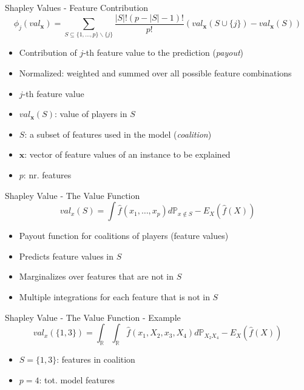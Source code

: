 \begin{frame}{Shapley Values - Feature Contribution}
\begin{equation}
	\phi_j(val_{\bm{x}})=\sum_{S\subseteq\{1,\ldots,p\} \backslash \{j\}}\frac{|S|!\left(p-|S|-1\right)!}{p!}\left(val_{\bm{x}}\left(S\cup\{j\}\right)-val_{\bm{x}}(S)\right)
\end{equation}
\begin{itemize}
	\item Contribution of $j$-th feature value to the prediction (\emph{payout})
	\item Normalized: weighted and summed over all possible feature combinations
	\item $j$-th feature value
	\item $val_{\bm{x}}(S)$: value of players in $S$ %
	\item $S$: a subset of features used in the model (\emph{coalition})
	\item $\bm{x}$: vector of feature values of an instance to be explained
	\item $p$: nr. features
\end{itemize}
\end{frame}

\begin{frame}{Shapley Value - The Value Function}
\begin{equation}
	val_{x}(S)=\int\hat{f}(x_{1},\ldots,x_{p})d\mathbb{P}_{x\notin{}S}-E_X(\hat{f}(X))
\end{equation}
\begin{itemize}
	\item Payout function for coalitions of players (feature values)
	\item Predicts feature values in $S$
	\item Marginalizes over features that are not in $S$
	\item Multiple integrations for each feature that is not in $S$
\end{itemize}
\end{frame}

\begin{frame}{Shapley Value - The Value Function - Example}
\begin{equation}
val_{x}(\{1,3\})=\int_{\mathbb{R}}\int_{\mathbb{R}}\hat{f}(x_{1},X_{2},x_{3},X_{4})d\mathbb{P}_{X_2X_4}-E_X(\hat{f}(X))
\end{equation}
\begin{itemize}
	\item $S = \{1,3\}$: features in coalition
	\item $p = 4$: tot. model features
\end{itemize}
\end{frame}


